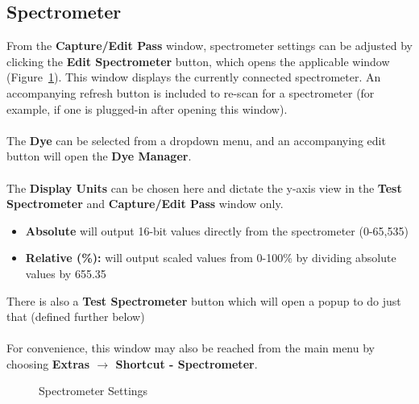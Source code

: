 \documentclass[10pt,letterpaper,titlepage]{article}
\begin{document}
    \subsection{Spectrometer}
    From the \textbf{Capture/Edit Pass} window, spectrometer settings can be adjusted by clicking the \textbf{Edit Spectrometer} button, which opens the applicable window (Figure~\ref{fig:spectrometer_settings}). This window displays the currently connected spectrometer. An accompanying refresh button is included to re-scan for a spectrometer (for example, if one is plugged-in after opening this window).\\\\
    The \textbf{Dye} can be selected from a dropdown menu, and an accompanying edit button will open the \textbf{Dye Manager}.\\\\
    The \textbf{Display Units} can be chosen here and dictate the y-axis view in the \textbf{Test Spectrometer} and \textbf{Capture/Edit Pass} window only. 
    \begin{itemize}
        \item \textbf{Absolute} will output 16-bit values directly from the spectrometer (0-65,535)
        \item \textbf{Relative (\%):} will output scaled values from 0-100\% by dividing absolute values by 655.35
    \end{itemize}
    There is also a \textbf{Test Spectrometer} button which will open a popup to do just that (defined further below)
    \\\\
    For convenience, this window may also be reached from the main menu by choosing \textbf{Extras $\rightarrow$ Shortcut - Spectrometer}.

    \begin{figure}[hb]
        \centering
        \caption{Spectrometer Settings}
        \label{fig:spectrometer_settings}
    \end{figure}
    \FloatBarrier
    \newpage
\end{document}
